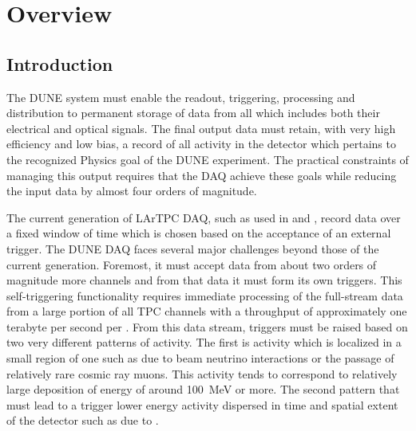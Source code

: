 \section{Overview}
\label{sec:fd-daq-ov}


\subsection{Introduction}
\label{sec:fd-daq-intro}

The DUNE   system must enable the readout,
triggering, processing and distribution to permanent storage of data
from all  which includes both their electrical
 and optical  signals.  
The final output data must retain, with very high efficiency and low
bias, a record of all activity in the detector which pertains to the
recognized Physics goal of the DUNE experiment. 
The practical constraints of managing this output requires that the
DAQ achieve these goals while reducing the input data by almost four
orders of magnitude.

The current generation of LArTPC DAQ, such as used in
 and \microboone, record data over a fixed window of
time which is chosen based on the acceptance of an external trigger. 
The DUNE DAQ faces several major challenges beyond those of the
current generation. 
Foremost, it must accept data from about two orders of magnitude more
channels and from that data it must form its own triggers.
This self-triggering functionality requires immediate processing of
the full-stream data from a large portion of all TPC channels with a
throughput of approximately one terabyte per second per
. 
From this data stream, triggers must be raised based on two very
different patterns of activity. 
The first is activity which is localized in a small region of one
 such as due to beam neutrino interactions or the
passage of relatively rare cosmic ray muons. 
This activity tends to correspond to relatively large deposition of
energy of around \SI{100}{\MeV} or more. 
The second pattern that must lead to a trigger lower energy activity
dispersed in time and spatial extent of the detector such as due to
.

